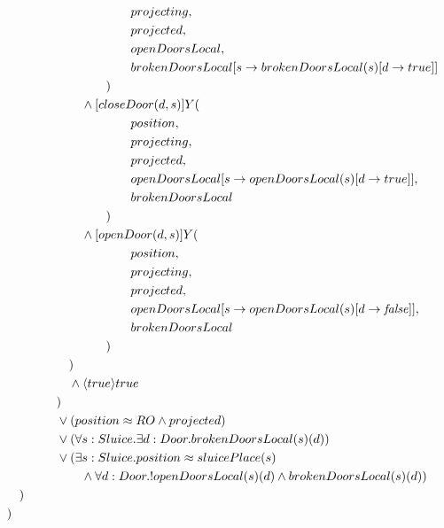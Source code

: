 \begin{description}
\begin{align*}
& \tab\tab\tab\tab\tab\tab\tab\tab\tab\tab\tab projecting, \\
& \tab\tab\tab\tab\tab\tab\tab\tab\tab\tab\tab projected, \\
& \tab\tab\tab\tab\tab\tab\tab\tab\tab\tab\tab openDoorsLocal, \\
& \tab\tab\tab\tab\tab\tab\tab\tab\tab\tab\tab brokenDoorsLocal[s \to brokenDoorsLocal(s)[d \to true]] \\
& \tab\tab\tab\tab\tab\tab\tab\tab\tab ) \\
& \tab\tab\tab\tab\tab\tab\tab  \wedge [closeDoor(d, s)]Y( \\
& \tab\tab\tab\tab\tab\tab\tab\tab\tab\tab\tab position, \\
& \tab\tab\tab\tab\tab\tab\tab\tab\tab\tab\tab projecting, \\
& \tab\tab\tab\tab\tab\tab\tab\tab\tab\tab\tab projected, \\
& \tab\tab\tab\tab\tab\tab\tab\tab\tab\tab\tab openDoorsLocal[s \to openDoorsLocal(s)[d \to true]], \\
& \tab\tab\tab\tab\tab\tab\tab\tab\tab\tab\tab brokenDoorsLocal \\
& \tab\tab\tab\tab\tab\tab\tab\tab\tab ) \\
& \tab\tab\tab\tab\tab\tab\tab \wedge [openDoor(d, s)]Y( \\
& \tab\tab\tab\tab\tab\tab\tab\tab\tab\tab\tab position, \\
& \tab\tab\tab\tab\tab\tab\tab\tab\tab\tab\tab projecting, \\
& \tab\tab\tab\tab\tab\tab\tab\tab\tab\tab\tab projected, \\
& \tab\tab\tab\tab\tab\tab\tab\tab\tab\tab\tab openDoorsLocal[s \to openDoorsLocal(s)[d \to \mathit{false}]], \\
& \tab\tab\tab\tab\tab\tab\tab\tab\tab\tab\tab brokenDoorsLocal \\
& \tab\tab\tab\tab\tab\tab\tab\tab\tab ) \\
& \tab\tab\tab\tab\tab\tab ) \\
& \tab\tab\tab\tab\tab\tab \wedge \langle true \rangle true \\
& \tab\tab\tab\tab\tab ) \\
& \tab\tab\tab\tab\tab \vee (position \approx RO \wedge projected) \\
& \tab\tab\tab\tab\tab \vee (\forall s: Sluice . \exists d: Door . brokenDoorsLocal(s)(d)) \\
& \tab\tab\tab\tab\tab \vee (\exists s: Sluice . position \approx sluicePlace(s) \\
& \tab\tab\tab\tab\tab\tab\tab \wedge \forall d: Door . !openDoorsLocal(s)(d) \wedge brokenDoorsLocal(s)(d)) \\
& \tab\tab ) \\
& \tab ) \\
\end{align*}
\cbend
 

\end{description}
